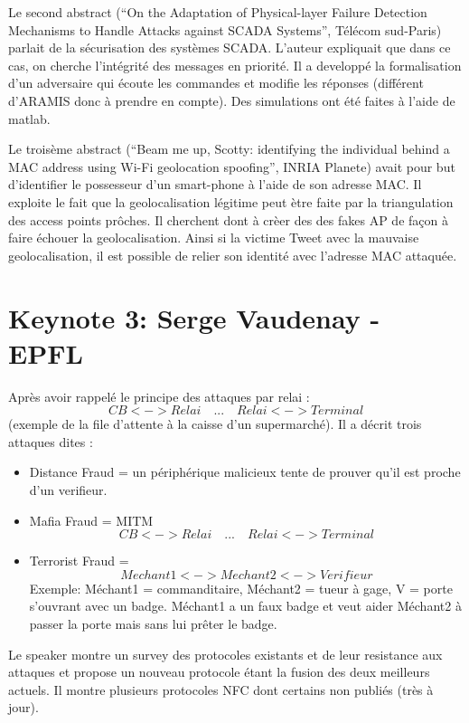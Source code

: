 \documentclass{article}
\begin{document}
Le second abstract (``On the Adaptation of Physical-layer Failure Detection Mechanisms to Handle Attacks against SCADA
Systems'', Télécom sud-Paris) parlait de la s\'ecurisation des syst\`emes SCADA. L'auteur expliquait que dans ce cas, on cherche l'int\'egrit\'e des messages en priorit\'e. Il a developp\'e la formalisation d'un adversaire qui \'ecoute les commandes et modifie les r\'eponses (diff\'erent d'ARAMIS donc \`a prendre en compte). Des simulations ont \'et\'e faites \`a l'aide de matlab.

Le trois\`eme abstract (``Beam me up, Scotty: identifying the individual behind a MAC address using Wi-Fi geolocation spoofing'', INRIA Planete) avait pour but d'identifier le possesseur d'un smart-phone \`a l'aide de son adresse MAC. Il exploite le fait que la geolocalisation l\'egitime peut \`etre faite par la triangulation des access points pr\^oches. Il cherchent dont \`a cr\`eer des des fakes AP de fa\c con \`a faire \'echouer la geolocalisation. Ainsi si la victime Tweet avec la mauvaise geolocalisation, il est possible de relier son identit\'e avec l'adresse MAC attaqu\'ee.


\section{Keynote 3: Serge Vaudenay - EPFL}

Apr\`es avoir rappel\'e le principe des attaques par relai : $$CB <-> Relai \quad ...\quad Relai <-> Terminal$$ (exemple de la file d'attente \`a la caisse d'un supermarch\'e). Il a d\'ecrit trois attaques dites :\\

\begin{itemize}
    \item Distance Fraud = un p\'eriph\'erique malicieux tente de prouver qu'il est proche d'un verifieur.
    \item Mafia Fraud = MITM $$CB <-> Relai \quad ...\quad Relai <-> Terminal$$
    \item Terrorist Fraud = $$Mechant1 <-> Mechant2 <-> Verifieur$$ Exemple: M\'echant1 = commanditaire, M\'echant2 = tueur \`a gage, V = porte s'ouvrant avec un badge. M\'echant1 a un faux badge et veut aider M\'echant2 \`a passer la porte mais sans lui pr\^eter le badge.
\end{itemize}

Le speaker montre un survey des protocoles existants et de leur resistance aux attaques et propose un nouveau protocole \'etant la fusion des deux meilleurs actuels. Il montre plusieurs protocoles NFC dont certains non publi\'es (tr\`es \`a jour).
\end{document}
